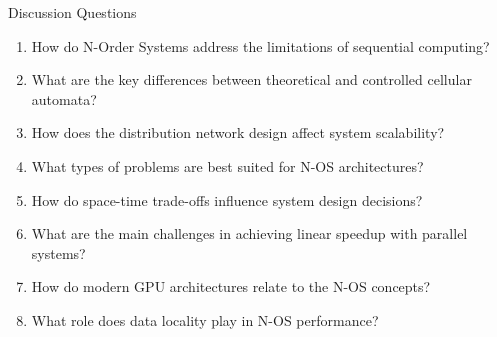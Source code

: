 \begin{frame}{Discussion Questions}
\begin{enumerate}
\item How do N-Order Systems address the limitations of sequential computing?
\item What are the key differences between theoretical and controlled cellular automata?
\item How does the distribution network design affect system scalability?
\item What types of problems are best suited for N-OS architectures?
\item How do space-time trade-offs influence system design decisions?
\item What are the main challenges in achieving linear speedup with parallel systems?
\item How do modern GPU architectures relate to the N-OS concepts?
\item What role does data locality play in N-OS performance?
\end{enumerate}
\end{frame}


